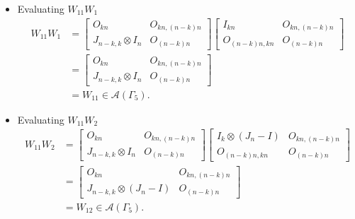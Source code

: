 \begin{itemize}
\item Evaluating $W_{11}W_{1}$
\begin{align*}
    W_{11}W_{1}
    &= \begin{bmatrix}
        O_{kn} & O_{kn, (n-k)n} \\
        J_{n-k, k}\otimes I_n & O_{(n-k)n}
    \end{bmatrix}
    \begin{bmatrix}
        I_{kn} & O_{kn, (n-k)n} \\
        O_{(n-k)n,kn} & O_{(n-k)n}
    \end{bmatrix}\\
    &= \begin{bmatrix}
        O_{kn} & O_{kn, (n-k)n} \\
        J_{n-k, k}\otimes I_n & O_{(n-k)n}
    \end{bmatrix}\\
    &= W_{11}\in\mathcal{A}(\Gamma_5).
\end{align*}

\item Evaluating $W_{11}W_{2}$
\begin{align*}
    W_{11}W_{2}
    &= \begin{bmatrix}
        O_{kn} & O_{kn, (n-k)n} \\
        J_{n-k, k}\otimes I_n & O_{(n-k)n}
    \end{bmatrix}
    \begin{bmatrix}
        I_k\otimes(J_n-I) & O_{kn, (n-k)n} \\
        O_{(n-k)n,kn} & O_{(n-k)n}
    \end{bmatrix}\\
    &= \begin{bmatrix}
        O_{kn} & O_{kn, (n-k)n} \\
        J_{n-k, k}\otimes (J_n-I) & O_{(n-k)n}
    \end{bmatrix}\\
    &= W_{12}\in\mathcal{A}(\Gamma_5).
\end{align*}


\end{itemize}
